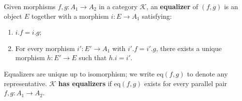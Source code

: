 Given morphisms $f, g: A_1 \longrightarrow A_2$ in a category $\mathcal{K}$, an \textbf{equalizer} of $(f, g)$ is an object $E$ together with a morphism $i: E \longrightarrow A_1$ satisfying:
\begin{enumerate}
\item $i.f = i.g$;
\item For every morphism $i': E' \longrightarrow A_1$ with $i'.f = i'.g$, there exists a unique morphism $h: E' \longrightarrow E$ such that $h.i = i'$.
\end{enumerate}
Equalizers are unique up to isomorphism; we write $\mathrm{eq}(f, g)$ to denote any representative. $\mathcal{K}$ \textbf{has equalizers} if $\mathrm{eq}(f, g)$ exists for every parallel pair $f, g: A_1 \longrightarrow A_2$.
